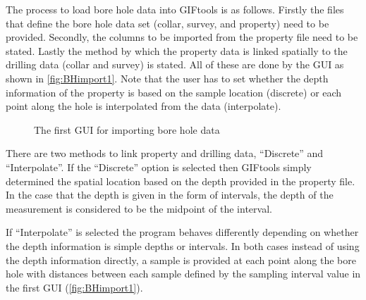  The process to load bore hole data into GIFtools is as follows. Firstly the files that define the bore hole data set (collar, survey, and property) need to be provided. Secondly, the columns to be imported from the property file need to be stated. Lastly the method by which the property data is linked spatially to the drilling data (collar and survey) is stated. All of these are done by the GUI as shown in \autoref{fig:BHimport1}. Note that the user has to set whether the depth information of the property is based on the sample location (discrete) or each point along the hole is interpolated from the data (interpolate).

 \begin{figure} [h]
    \centering
    \caption{The first \ac{GUI} for importing bore hole data}
    \label{fig:BHimport1}
\end{figure}

There are two methods to link property and drilling data,  ``Discrete'' and ``Interpolate''. If the ``Discrete'' option is selected then GIFtools simply determined the spatial location based on the depth provided in the property file. In the case that the depth is given in the form of intervals, the depth of the measurement is considered to be the midpoint of the interval. 

If ``Interpolate'' is selected the program behaves differently depending on whether the depth information is simple depths or intervals. In both cases instead of using the depth information directly, a sample is provided at each point along the bore hole with distances between each sample defined by the sampling interval value in the first \ac{GUI} (\autoref{fig:BHimport1}).

